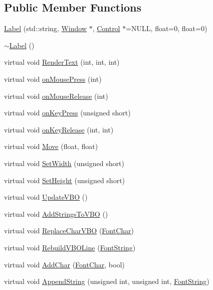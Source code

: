 \subsection*{Public Member Functions}
\begin{CompactItemize}
\item 
\hyperlink{class_label_f18c93c34ae5c24d8fc851c6c8d3ce14}{Label} (std::string, \hyperlink{class_window}{Window} $\ast$, \hyperlink{class_control}{Control} $\ast$=NULL, float=0, float=0)
\item 
\hyperlink{class_label_39e1167a9b5827afd888780973d88894}{$\sim$Label} ()
\item 
virtual void \hyperlink{class_label_d775a052255dc0bcfa5d84f13de6876d}{RenderText} (int, int, int)
\item 
virtual void \hyperlink{class_label_83f0487c73dad47556758882f00acc3f}{onMousePress} (int)
\item 
virtual void \hyperlink{class_label_e603188d29229b2cc2a6bfe9f5117856}{onMouseRelease} (int)
\item 
virtual void \hyperlink{class_label_8d87b0d4112a3036ea815bb289738a45}{onKeyPress} (unsigned short)
\item 
virtual void \hyperlink{class_label_8bf84bdf751eaeb42d226ba021b63413}{onKeyRelease} (int, int)
\item 
virtual void \hyperlink{class_label_7be1625ce797ee05dcf6c7553ba0705f}{Move} (float, float)
\item 
virtual void \hyperlink{class_label_3a4df4c494eff40456404ddcef31aa25}{SetWidth} (unsigned short)
\item 
virtual void \hyperlink{class_label_1237536d3b3a0eb3f4b0408c647e5733}{SetHeight} (unsigned short)
\item 
virtual void \hyperlink{class_label_8cfc4630159f4953bbc721208f2c4e1d}{UpdateVBO} ()
\item 
virtual void \hyperlink{class_label_95db1d28f73e679156239672f3f3802a}{AddStringsToVBO} ()
\item 
virtual void \hyperlink{class_label_35b537e0b6c27f34a73bd2632b071c37}{ReplaceCharVBO} (\hyperlink{struct_font_char}{FontChar})
\item 
virtual void \hyperlink{class_label_dfd5552e4813ba995a09d6aa85731d72}{RebuildVBOLine} (\hyperlink{struct_font_string}{FontString})
\item 
virtual void \hyperlink{class_label_4049a5e443fb19729c07542feb34e2b6}{AddChar} (\hyperlink{struct_font_char}{FontChar}, bool)
\item 
virtual void \hyperlink{class_label_6cc69098d090f7b943bbd6e7a313967b}{AppendString} (unsigned int, unsigned int, \hyperlink{struct_font_string}{FontString})
\end{CompactItemize}
